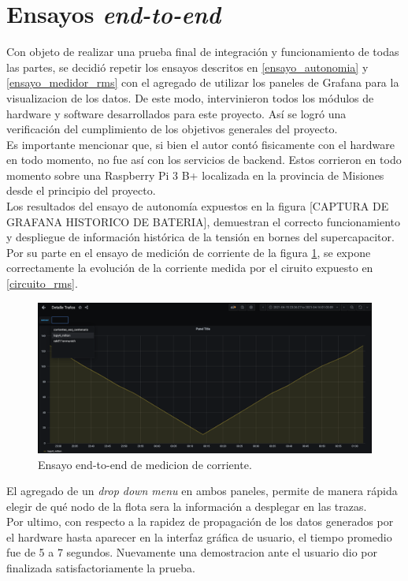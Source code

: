 \section{Ensayos \textit{end-to-end}}
Con objeto de realizar una prueba final de integraci\'{o}n y funcionamiento de todas las partes, se decidi\'{o} repetir los ensayos descritos en \ref{ensayo_autonomia} y \ref{ensayo_medidor_rms} con el agregado de utilizar los paneles de Grafana para la visualizacion de los datos. De este modo, intervinieron todos los m\'{o}dulos de hardware y software desarrollados para este proyecto. As\'{i} se logr\'{o} una verificaci\'{o}n del cumplimiento de los objetivos generales del proyecto.\\
Es importante mencionar que, si bien el autor cont\'{o} fisicamente con el hardware en todo momento, no fue as\'{i} con los servicios de backend. Estos corrieron en todo momento sobre una Raspberry Pi 3 B+ localizada en la provincia de Misiones desde el principio del proyecto.\\
Los resultados del ensayo de autonomía expuestos en la figura [CAPTURA DE GRAFANA HISTORICO DE BATERIA], demuestran el correcto funcionamiento y despliegue de informaci\'{o}n hist\'{o}rica de la tensión en bornes del supercapacitor.\\
Por su parte en el ensayo de medici\'{o}n de corriente de la figura \ref{fig:capturahistoricodropdown}, se expone correctamente la evoluci\'{o}n de la corriente medida por el ciruito expuesto en \ref{circuito_rms}.\\

\begin{figure}[h]
	\centering
	\includegraphics[width=1.0\linewidth]{Figures/captura_historico_dropdown}
	\caption{Ensayo end-to-end de medicion de corriente.}
	\label{fig:capturahistoricodropdown}
\end{figure}
El agregado de un \textit{drop down menu} en ambos paneles, permite de manera r\'{a}pida elegir de qu\'{e} nodo de la flota sera la informaci\'{o}n a desplegar en las trazas.\\
Por ultimo, con respecto a la rapidez de propagaci\'{o}n de los datos generados por el hardware hasta aparecer en la interfaz gráfica de usuario, el tiempo promedio fue de 5 a 7 segundos. Nuevamente una demostracion ante el usuario dio por finalizada satisfactoriamente la prueba.